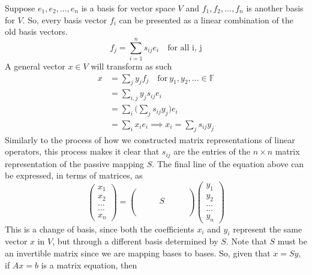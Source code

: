   Suppose ${e_1, e_2, ..., e_n}$ is a basis for vector space $V$ and ${f_1, f_2, ..., f_n}$ is another basis for $V$. So, every basis vector $f_i$ can be presented as a linear combination of the old basis vectors. 
  \begin{equation}
    f_j = \sum_{i =1}^{n} s_{i j} e_i \quad \text{for all i, j}
  \end{equation}
  A general vector $x \in V$ will transform as such
  \begin{equation} 
    \label{eq1}
    \begin{split}
      x & = \sum_{j} y_j f_j \quad \text{for} \ y_{1}, y_{2}, ... \in \mathbb{F} \\
      & = \sum_{i,j} y_j s_{i j} e_i \\
      & = \sum_{i} \Big( \sum_{j} s_{i j} y_j \Big) e_i \\
      & = \sum_{i} x_i e_i \implies x_i = \sum_{j} s_{i j} y_j
    \end{split}
  \end{equation}
  Similarly to the process of how we constructed matrix representations of linear operators, this process makes it clear that $s_{i j}$ are the entries of the $n \times n$ matrix representation of the passive mapping $S$. The final line of the equation above can be expressed, in terms of matrices, as 
  \begin{equation}
    \begin{pmatrix}x_1\\x_2\\...\\...\\x_n\end{pmatrix} = 
    \begin{pmatrix} \\ \\ & & & S & & &  \\\\\\\end{pmatrix} \begin{pmatrix}
    y_1\\y_2\\...\\...\\y_n\end{pmatrix}
  \end{equation}
  This is a change of basis, since both the coefficients $x_i$ and $y_i$ represent the same vector $x$ in $V$, but through a different basis determined by $S$. Note that $S$ must be an invertible matrix since we are mapping bases to bases. So, given that $x = S y$, if $Ax = b$ is a matrix equation, then
